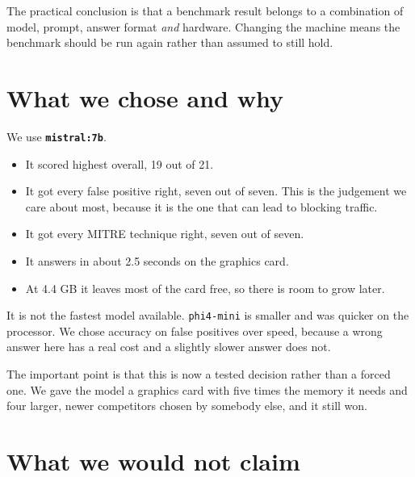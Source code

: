 \documentclass[11pt,a4paper]{article}
\begin{document}
The practical conclusion is that a benchmark result belongs to a combination of model,
prompt, answer format \emph{and} hardware. Changing the machine means the benchmark
should be run again rather than assumed to still hold.

\section{What we chose and why}

We use \textbf{\texttt{mistral:7b}}.

\begin{itemize}[nosep]
  \item It scored highest overall, 19 out of 21.
  \item It got every false positive right, seven out of seven. This is the judgement
        we care about most, because it is the one that can lead to blocking traffic.
  \item It got every MITRE technique right, seven out of seven.
  \item It answers in about 2.5 seconds on the graphics card.
  \item At 4.4 GB it leaves most of the card free, so there is room to grow later.
\end{itemize}

It is not the fastest model available. \texttt{phi4-mini} is smaller and was quicker
on the processor. We chose accuracy on false positives over speed, because a wrong
answer here has a real cost and a slightly slower answer does not.

The important point is that this is now a tested decision rather than a forced one.
We gave the model a graphics card with five times the memory it needs and four
larger, newer competitors chosen by somebody else, and it still won.

\section{What we would not claim}
\end{document}
